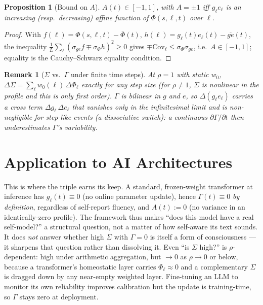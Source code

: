 \documentclass[11pt]{article}
\newtheorem*{remark}{Remark}
\newtheorem{proposition}{Proposition}
\begin{document}
\begin{proposition}[Bound on $A$]
$A(t)\in[-1,1]$, with $A=\pm1$ iff $g_\ell e_\ell$ is an increasing (resp.\ decreasing) affine function of $\Phi(s,\ell,t)$ over $\ell$.
\end{proposition}
\begin{proof}
With $f(\ell)=\Phi(s,\ell,t)-\bar\Phi(t)$, $h(\ell)=g_\ell(t)e_\ell(t)-\overline{ge}(t)$, the inequality $\frac1L\sum_\ell(\sigma_{ge}f\mp\sigma_\Phi h)^2\ge0$ gives $\mp\mathrm{Cov}_\ell\le\sigma_\Phi\sigma_{ge}$, i.e.\ $A\in[-1,1]$; equality is the Cauchy--Schwarz equality condition.
\end{proof}

\begin{remark}[$\Sigma$ vs.\ $\Gamma$ under finite time steps]
At $\rho=1$ with static $w_0$, $\Delta\Sigma=\sum_\ell w_0(\ell)\,\Delta\Phi_\ell$ exactly for any step size (for $\rho\neq1$, $\Sigma$ is nonlinear in the profile and this is only first order). $\Gamma$ is bilinear in $g$ and $e$, so $\Delta(g_\ell e_\ell)$ carries a cross term $\Delta g_\ell\,\Delta e_\ell$ that vanishes only in the infinitesimal limit and is non-negligible for step-like events (a dissociative switch): a continuous $\partial\Gamma/\partial t$ then underestimates $\Gamma$'s variability.
\end{remark}

\section{Application to AI Architectures}\label{sec:ai}

This is where the triple earns its keep. A standard, frozen-weight transformer at inference has $g_\ell(t)\equiv0$ (no online parameter update), hence $\Gamma(t)\equiv0$ \emph{by definition}, regardless of self-report fluency, and $A(t):=0$ (no variance in an identically-zero profile). The framework thus makes ``does this model have a real self-model?'' a structural question, not a matter of how self-aware its text sounds. It does \emph{not} answer whether high $\Sigma$ with $\Gamma=0$ is itself a form of consciousness --- it sharpens that question rather than dissolving it. Even ``is $\Sigma$ high?'' is $\rho$-dependent: high under arithmetic aggregation, but $\to0$ as $\rho\to0$ or below, because a transformer's homeostatic layer carries $\Phi_\ell\approx0$ and a complementary $\Sigma$ is dragged down by any near-empty weighted layer. Fine-tuning an LLM to monitor its own reliability \cite{predmetacog2026} improves calibration but the update is training-time, so $\Gamma$ stays zero at deployment.
\end{document}
